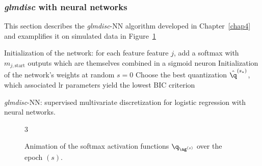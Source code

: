 \subsubsection{\textit{glmdisc} with neural networks} \label{app1:glmdiscNN}

This section describes the \textit{glmdisc}-NN algorithm developed in Chapter~\ref{chap4} and examplifies it on simulated data in Figure~\ref{fig:animNN}

\begin{algorithm}[H]
 Initialization of the network: for each feature feature $j$, add a softmax with $m_{j,\text{start}}$ outputs which are themselves combined in a sigmoid neuron\;
 Initialization of the network's weights at random\;
 $s = 0$\;
 Choose the best quantization $\hat{\q}^{(s_\star)}$, which associated \gls{lr} parameters yield the lowest BIC criterion\;
 \caption{\label{NN-disc} \textit{glmdisc}-NN: supervised multivariate discretization for logistic regression with neural networks.}
\end{algorithm}

\begin{figure}[!h]
\begin{animateinline}[poster=first, controls=all, palindrome, autopause, autoresume, width=\textwidth, height=6cm]{3}
%
\end{animateinline}
\caption{\label{fig:animNN} Animation of the softmax activation functions $\q_{\ag^{(s)}}$ over the epoch $(s)$.}
\end{figure}




